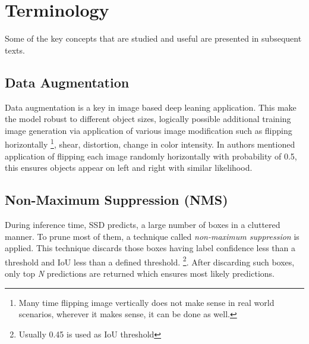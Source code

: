
\section{Terminology}
Some of the key concepts that are studied and useful are presented in subsequent texts.

\subsection{Data Augmentation}
Data augmentation is a key in image based deep leaning application. This make the model robust to different object sizes, logically possible  additional training image generation via application of various image modification such as flipping horizontally \footnote{Many time flipping image vertically does not make sense in real world scenarios, wherever it makes sense, it can be done as well.}, shear, distortion, change in color intensity. In \cite{liu2016ssd} authors mentioned application of flipping each image randomly horizontally with probability of 0.5, this ensures objects appear on left and right with similar likelihood.

\subsection{Non-Maximum Suppression (NMS)}
During inference time, SSD predicts, a large number of boxes in a cluttered manner. To prune most of them, a technique called \textit{non-maximum suppression} is applied. This technique discards those boxes having label confidence less than a threshold and IoU less than a defined threshold. \footnote{Usually 0.45 is used as IoU threshold}. After discarding such boxes, only top \textit{N} predictions are returned which ensures most likely predictions.
